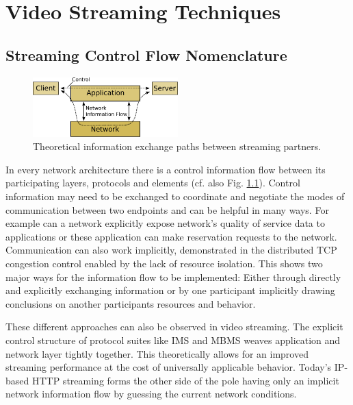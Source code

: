 \chapter{Video Streaming Techniques}



\section{Streaming Control Flow Nomenclature}


\begin{figure}
\centering
\includegraphics[width=0.5\textwidth]{images/expose/nif.pdf}
\caption{Theoretical information exchange paths between streaming partners.}
\label{fig:nif}
\end{figure}

In every network architecture there is a control information flow between its participating layers, protocols and elements (cf. also Fig. \ref{fig:nif}). Control information may need to be exchanged to coordinate and negotiate the modes of communication between two endpoints and can be helpful in many ways. For example can a network explicitly expose network's quality of service data to applications or these application can make reservation requests to the network. Communication can also work implicitly, demonstrated in the distributed TCP congestion control enabled by the lack of resource isolation. This shows two major ways for the information flow to be implemented: Either through directly and explicitly exchanging information or by one participant implicitly drawing conclusions on another participants resources and behavior.

These different approaches can also be observed in video streaming. The explicit control structure of protocol suites like IMS\cite{3gpp23228} and MBMS weaves application and network layer tightly together. This theoretically allows for an improved streaming performance at the cost of universally applicable behavior. Today's IP-based HTTP streaming forms the other side of the pole having only an implicit network information flow by guessing the current network conditions.

